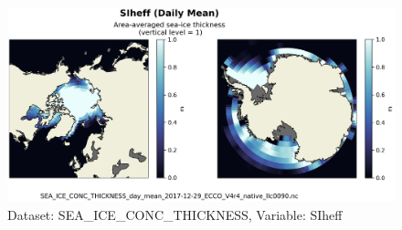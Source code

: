 \begin{figure}[H]
\centering
\includegraphics[scale=0.55]{../images/plots/v4r4/native_plots/Sea-Ice_and_Snow_Concentration_and_Thickness/SIheff.png}
\caption{Dataset: SEA\_ICE\_CONC\_THICKNESS, Variable: SIheff}
\label{tab:table-SEA_ICE_CONC_THICKNESS_SIheff-Plot}
\end{figure}
\newpage
\pagebreak
